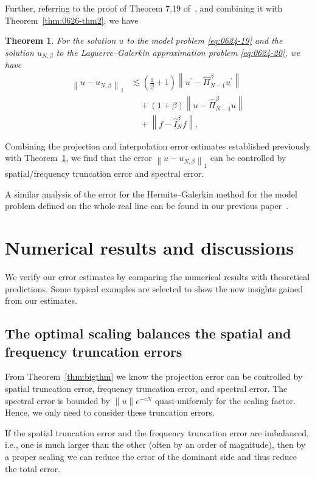 \documentclass[pdflatex,sn-aps]{sn-jnl}%
\theoremstyle{thmstyleone}%
\newtheorem{theorem}{Theorem}[section]%
\theoremstyle{thmstyletwo}%
\theoremstyle{thmstylethree}%
\begin{document}
Further, referring to the proof of Theorem 7.19 of~\cite{shen2011spectral}, and
combining it with Theorem~\ref{thm:0626-thm2}, we have
\begin{theorem}\label{thm:0626-thm3}
  For the solution $u$ to the model problem \eqref{eq:0624-19} and
  the solution $u_{N,\beta}$ to the Laguerre--Galerkin approximation
  problem \eqref{eq:0624-20}, we have
  \begin{equation}\label{eq:0626-thm3}
    \begin{aligned}
    \left\|u-u_{N,\beta}\right\|_1 & \lesssim\left(\frac{1}{\beta}+1\right)\left\|u^{\prime}-\widehat{\Pi}_{N-1}^\beta u^{\prime}\right\| \\
    &\quad +(1+\beta)\left\|u-\widehat{\Pi}_{N-1}^\beta u\right\| \\
    &\quad +\left\|f-\widehat{I}_{N}^\beta f\right\|.
    \end{aligned}
  \end{equation}
\end{theorem}
Combining the projection and interpolation error estimates established
previously with Theorem~\ref{thm:0626-thm3}, we find that the error $\left\|u-u_{N,\beta}\right\|_1$
can be controlled by spatial/frequency truncation error and spectral error.

A similar analysis of the error for the Hermite--Galerkin method for the model problem defined on the whole real line can be found in our previous paper~\cite{hu2024scaling}.

\section{Numerical results and discussions}
\label{sec:experiments}
We verify our error estimates by comparing the numerical results with theoretical predictions. Some typical examples are selected to show the new insights gained from our estimates.

\subsection{The optimal scaling balances the spatial and frequency truncation errors}
From Theorem~\ref{thm:bigthm} we know the projection error can be controlled by spatial truncation error, frequency truncation error, and spectral error. The spectral error is bounded by $\|u\|e^{-cN}$ quasi-uniformly for the scaling factor. Hence, we only need to consider these truncation errors.

If the spatial truncation error and the frequency truncation error are imbalanced, i.e., one is much larger than the other (often by an order of magnitude), then by a proper scaling we can reduce the error of the dominant side and thus reduce the total error.
\end{document}
